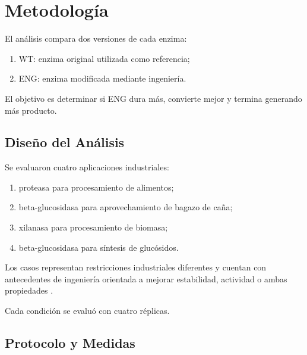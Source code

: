 \section{Metodología}
\label{sec:metodologia}

El análisis compara dos versiones de cada enzima:

\begin{enumerate}
    \item WT: enzima original utilizada como referencia;
    \item ENG: enzima modificada mediante ingeniería.
\end{enumerate}

El objetivo es determinar si ENG dura más, convierte mejor y termina generando
más producto.

\subsection{Diseño del Análisis}
\label{subsec:diseno}

Se evaluaron cuatro aplicaciones industriales:

\begin{enumerate}
    \item proteasa para procesamiento de alimentos;
    \item beta-glucosidasa para aprovechamiento de bagazo de caña;
    \item xilanasa para procesamiento de biomasa;
    \item beta-glucosidasa para síntesis de glucósidos.
\end{enumerate}

Los casos representan restricciones industriales diferentes y cuentan con
antecedentes de ingeniería orientada a mejorar estabilidad, actividad o ambas
propiedades
\citep{yuan_apre2709_2025,cao_ks5a7_2018,zhang_xylanase_2010,yin_bgl1d_2019}.

Cada condición se evaluó con cuatro réplicas.

\subsection{Protocolo y Medidas}
\label{subsec:protocolo}

